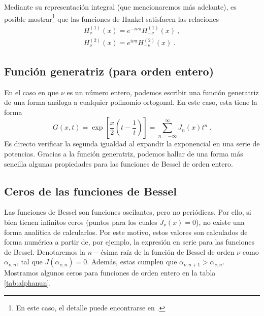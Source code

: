 Mediante su representación integral (que mencionaremos más adelante), es posible mostrar\footnote{En este caso, el detalle puede encontrarse en \cite{Arfken}.} que las funciones de Hankel satisfacen las relaciones
\begin{align}
    H_\nu^{(1)}(x) = e^{-i\nu\pi} H_{-\nu}^{(1)}(x) \ , \\
    H_\nu^{(2)}(x) = e^{i\nu\pi} H_{-\nu}^{(2)}(x) \ .
\end{align}


\subsection{Función generatriz (para orden entero)}

En el caso en que $\nu$ es un número entero, podemos escribir una función generatriz de una forma análoga a cualquier polinomio ortogonal. En este caso, esta tiene la forma
\begin{equation}
    G(x,t) = \exp\left[ \frac{x}{2} \left( t - \frac{1}{t} \right) \right] = \sum_{n = -\infty}^\infty J_n(x) t^n \ .
\end{equation}
Es directo verificar la segunda igualdad al expandir la exponencial en una serie de potencias. Gracias a la función generatriz, podemos hallar de una forma más sencilla algunas propiedades para las funciones de Bessel de orden entero.

\subsection{Ceros de las funciones de Bessel}

Las funciones de Bessel son funciones oscilantes, pero no periódicas. Por ello, si bien tienen infinitos ceros (puntos para los cuales $J_\nu(x) = 0$), no existe una forma analítica de calcularlos. Por este motivo, estos valores son calculados de forma numérica a partir de, por ejemplo, la expresión en serie para las funciones de Bessel. Denotaremos la $n-$ésima raíz de la función de Bessel de orden $\nu$ como $\alpha_{\nu, n}$, tal que $J(\alpha_{\nu, n}) = 0$. Además, estas cumplen que $\alpha_{\nu, n+1} > \alpha_{\nu, n}$. Mostramos algunos ceros para funciones de orden entero en la tabla \ref{tab:alphanun}.

